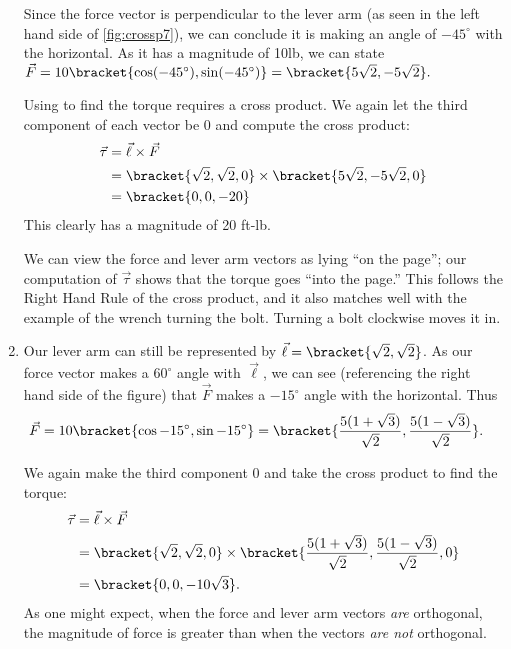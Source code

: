 \begin{example}
\begin{enumerate}
	Since the force vector is perpendicular to the lever arm (as seen in the left hand side of \autoref{fig:crossp7}), we can conclude it is making an angle of $-45^\circ$ with the horizontal. As it has a magnitude of 10lb, we can state $\vec F = 10\bracket{\cos (-45^\circ), \sin(-45^\circ)}= \bracket{5\sqrt2,-5\sqrt2}.$
	
	Using  to find the torque requires a cross product. We again let the third component of each vector be 0  and compute the cross product:
	\begin{align*}
	\vec\tau &= \vec \ell\times\vec F \\
				&= \bracket{\sqrt2,\sqrt2,0}\times \bracket{5\sqrt2,-5\sqrt2,0}\\
				&= \bracket{0,0,-20}
	\end{align*}
	This clearly has a magnitude of 20 ft-lb.
		
	We can view the force and lever arm vectors as lying ``on the page''; our computation of $\vec\tau$ shows that the torque goes ``into the page.'' This follows the Right Hand Rule of the cross product, and it also matches well with the example of the wrench turning the bolt. Turning a bolt clockwise moves it in.
	
	\item		Our lever arm can still be represented by $\vec \ell = \bracket{\sqrt2,\sqrt2}$. As our force vector makes a $60^\circ$ angle with $\vec \ell$, we can see (referencing the right hand side of the figure) that $\vec F$ makes a $-15^\circ$ angle with the horizontal. Thus 
	\begin{align*}
	\vec F = 10\bracket{\cos-15^\circ,\sin-15^\circ}&= \bracket{\frac{5(1+\sqrt3)}{\sqrt2},\frac{5(1-\sqrt3)}{\sqrt2}}
	.\end{align*}
	
	We again make the third component 0 and take the cross product to find the torque:
	\begin{align*}
	\vec\tau &= \vec \ell\times\vec F\\
	&= \bracket{\sqrt2,\sqrt2,0}\times  \bracket{\frac{5(1+\sqrt3)}{\sqrt2},\frac{5(1-\sqrt3)}{\sqrt2},0}\\
	&= \bracket{0,0,-10\sqrt3}
	.
	\end{align*}
	As one might expect, when the force and lever arm vectors \emph{are} orthogonal, the magnitude of force is greater than when the vectors \emph{are not} orthogonal.
\end{enumerate}
\end{example}

